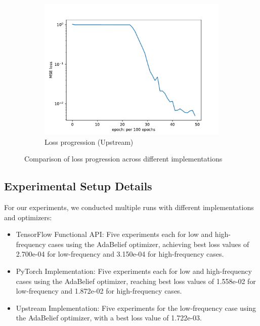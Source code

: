\documentclass[10pt,journal,compsoc,onecolumn]{IEEEtran}
\begin{document}
\begin{figure}[htbp]
    \begin{subfigure}[b]{0.3\textwidth}
        \includegraphics[width=\textwidth]{../../results/upstream/low-frequency-adabelief-20250206-1105-1/loss}
        \caption{Loss progression (Upstream)}
        \label{fig:loss_upstream}
    \end{subfigure}
    \caption{Comparison of loss progression across different implementations}
    \label{fig:loss_comparison}
\end{figure}

\subsection{Experimental Setup Details}
For our experiments, we conducted multiple runs with different implementations and optimizers:
\begin{itemize}
    \item TensorFlow Functional API: Five experiments each for low and high-frequency cases using the AdaBelief optimizer, achieving best loss values of 2.700e-04 for low-frequency and 3.150e-04 for high-frequency cases.
    \item PyTorch Implementation: Five experiments each for low and high-frequency cases using the AdaBelief optimizer, reaching best loss values of 1.558e-02 for low-frequency and 1.872e-02 for high-frequency cases.
    \item Upstream Implementation: Five experiments for the low-frequency case using the AdaBelief optimizer, with a best loss value of 1.722e-03.
\end{itemize}
\end{document}
